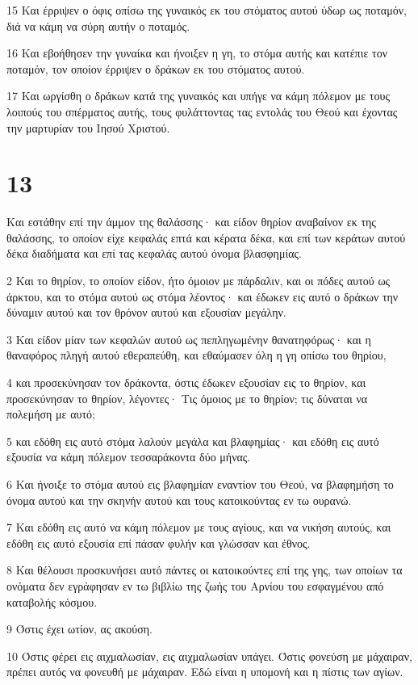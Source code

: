 \par 15 Και έρριψεν ο όφις οπίσω της γυναικός εκ του στόματος αυτού ύδωρ ως ποταμόν, διά να κάμη να σύρη αυτήν ο ποταμός.
\par 16 Και εβοήθησεν την γυναίκα και ήνοιξεν η γη, το στόμα αυτής και κατέπιε τον ποταμόν, τον οποίον έρριψεν ο δράκων εκ του στόματος αυτού.
\par 17 Και ωργίσθη ο δράκων κατά της γυναικός και υπήγε να κάμη πόλεμον με τους λοιπούς του σπέρματος αυτής, τους φυλάττοντας τας εντολάς του Θεού και έχοντας την μαρτυρίαν του Ιησού Χριστού.

\chapter{13}

\par Και εστάθην επί την άμμον της θαλάσσης· και είδον θηρίον αναβαίνον εκ της θαλάσσης, το οποίον είχε κεφαλάς επτά και κέρατα δέκα, και επί των κεράτων αυτού δέκα διαδήματα και επί τας κεφαλάς αυτού όνομα βλασφημίας.
\par 2 Και το θηρίον, το οποίον είδον, ήτο όμοιον με πάρδαλιν, και οι πόδες αυτού ως άρκτου, και το στόμα αυτού ως στόμα λέοντος· και έδωκεν εις αυτό ο δράκων την δύναμιν αυτού και τον θρόνον αυτού και εξουσίαν μεγάλην.
\par 3 Και είδον μίαν των κεφαλών αυτού ως πεπληγωμένην θανατηφόρως· και η θαναφόρος πληγή αυτού εθεραπεύθη, και εθαύμασεν όλη η γη οπίσω του θηρίου,
\par 4 και προσεκύνησαν τον δράκοντα, όστις έδωκεν εξουσίαν εις το θηρίον, και προσεκύνησαν το θηρίον, λέγοντες· Τις όμοιος με το θηρίον; τις δύναται να πολεμήση με αυτό;
\par 5 και εδόθη εις αυτό στόμα λαλούν μεγάλα και βλαφημίας· και εδόθη εις αυτό εξουσία να κάμη πόλεμον τεσσαράκοντα δύο μήνας.
\par 6 Και ήνοιξε το στόμα αυτού εις βλαφημίαν εναντίον του Θεού, να βλαφημήση το όνομα αυτού και την σκηνήν αυτού και τους κατοικούντας εν τω ουρανώ.
\par 7 Και εδόθη εις αυτό να κάμη πόλεμον με τους αγίους, και να νικήση αυτούς, και εδόθη εις αυτό εξουσία επί πάσαν φυλήν και γλώσσαν και έθνος.
\par 8 Και θέλουσι προσκυνήσει αυτό πάντες οι κατοικούντες επί της γης, των οποίων τα ονόματα δεν εγράφησαν εν τω βιβλίω της ζωής του Αρνίου του εσφαγμένου από καταβολής κόσμου.
\par 9 Όστις έχει ωτίον, ας ακούση.
\par 10 Όστις φέρει εις αιχμαλωσίαν, εις αιχμαλωσίαν υπάγει. Όστις φονεύση με μάχαιραν, πρέπει αυτός να φονευθή με μάχαιραν. Εδώ είναι η υπομονή και η πίστις των αγίων.
